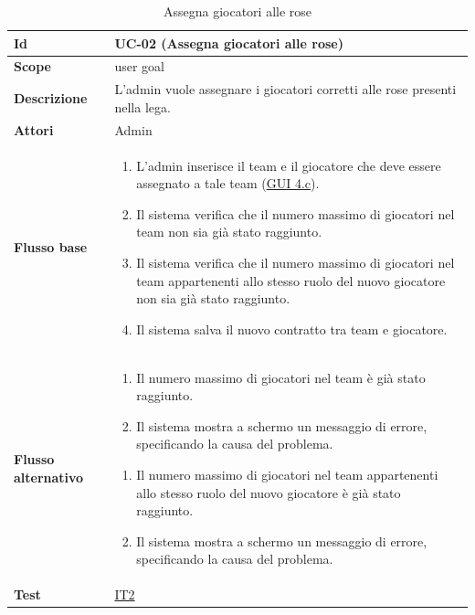 \begin{table}[H]
\caption{Assegna giocatori alle rose}
\label{UC-02}

\begin{tabularx}{\textwidth}{|l|X|}
\hline
\textbf{Id} & UC-02 (Assegna giocatori alle rose) \\
\hline
\textbf{Scope} & user goal \\
\hline
\textbf{Descrizione} & L'admin vuole assegnare i giocatori corretti alle rose presenti nella lega. \\
\hline
\textbf{Attori} & Admin \\
\hline
\textbf{Flusso base} &
\begin{enumerate}[leftmargin=*]
    \item L'admin inserisce il team e il giocatore che deve essere assegnato a tale team (\hyperref[fig:mockup_parte4]{GUI 4.c}).
    \item Il sistema verifica che il numero massimo di giocatori nel team non sia già stato raggiunto.
    \item Il sistema verifica che il numero massimo di giocatori nel team appartenenti allo 
            stesso ruolo del nuovo giocatore non sia già stato raggiunto.
    \item Il sistema salva il nuovo contratto tra team e giocatore.
\end{enumerate} \\
\hline
\textbf{Flusso alternativo} &
\begin{enumerate}[leftmargin=*,label=2.\arabic*]
    \item Il numero massimo di giocatori nel team è già stato raggiunto.
    \item Il sistema mostra a schermo un messaggio di errore, specificando la causa del problema.
\end{enumerate}
\begin{enumerate}[leftmargin=*,label=3.\arabic*]
    \item Il numero massimo di giocatori nel team appartenenti allo stesso ruolo
            del nuovo giocatore è già stato raggiunto.
    \item Il sistema mostra a schermo un messaggio di errore, specificando la causa del problema.
\end{enumerate} \\
\hline
\textbf{Test} & \hyperref[IT2]{IT2} \\
\hline
\end{tabularx}

\end{table}



